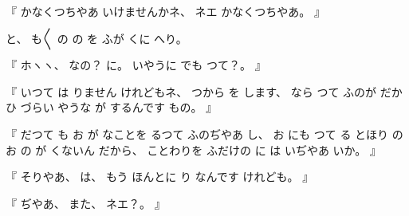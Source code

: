 %
『
かなくつちやあ
いけませんかネ、
%
ネエ
かなくつちやあ。
』

%
と、
%
も〳〵
の
の
を
ふが
くに
へり。

%
『
ホヽヽ、
%
なの？\inhibitglue{}%
に。
%
いやうに
でも
つて？。
』

%
『
いつて
は
りません
けれどもネ、
%
つから
を
します、
%
なら
つて
ふのが
だか
ひ
づらい
やうな
が
するんです
もの。
』

%
『
だつて
も
お
が
なことを
るつて
ふのぢやあ
し、
%
お
にも
つて
る
とほり
の
お
の
が
くないん
だから、
%
ことわりを
ふだけの
に
は
いぢやあ
いか。
』

%
『
そりやあ、
%
は、
%
もう
ほんとに
り
なんです
けれども。
』

%
『
ぢやあ、
%
また、
%
ネエ？。
』

